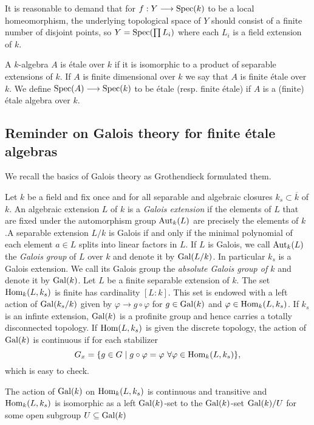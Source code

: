 It is reasonable to demand that for $f: Y \longrightarrow \operatorname{Spec}(k)$ to be a local homeomorphism, the underlying topological space of $Y$ should consist of a finite number of disjoint points, so $Y = \operatorname{Spec}(\prod L_i)$ where each $L_i$ is a field extension of $k$.

\begin{definition}
	A $k$-algebra $A$ is \'etale over $k$ if it is isomorphic to a product of separable extensions of $k$. If $A$ is finite dimensional over $k$ we say that $A$ is finite \'etale over $k$. We define $\operatorname{Spec}(A) \longrightarrow \operatorname{Spec}(k)$ to be \'etale (resp. finite \'etale) if $A$ is a (finite) \'etale algebra over $k$.
\end{definition}

\subsection{Reminder on Galois theory for finite \'etale algebras}
We recall the basics of Galois theory as Grothendieck formulated them.

\begin{construction}
	Let $k$ be a field and fix once and for all separable and algebraic closures $k_s \subset \overline{k}$ of $k$. An algebraic extension $L$ of $k$ is a \textit{Galois extension} if the elements of $L$ that are fixed under the automorphism group $\operatorname{Aut}_k(L)$ are precisely the elements of $k$.A separable extension $L/k$ is Galois if and only if the minimal polynomial of each element $a \in L$ splits into linear factors in $L$. If $L$ is Galois, we call $\operatorname{Aut}_k(L)$ the \textit{Galois group} of $L$ over $k$ and denote it by $\operatorname{Gal}(L/k)$. In particular $k_s$ is a Galois extension. We call its Galois group the \textit{absolute Galois group of $k$} and denote it by $\operatorname{Gal}(k)$. Let $L$ be a finite separable extension of $k$. The set $\operatorname{Hom}_k(L, k_s)$ is finite has cardinality $[L:k]$. This set is endowed with a left action of $\operatorname{Gal}(k_s/k)$ given by $\varphi \to g \circ \varphi$ for $g \in \operatorname{Gal}(k)$ and $\varphi \in \operatorname{Hom}_k(L, k_s)$. If $k_s$ is an infinte extension, $\operatorname{Gal}(k)$ is a profinite group and hence carries a totally disconnected topology. If $\operatorname{Hom}(L, k_s)$ is given the discrete topology, the action of $\operatorname{Gal}(k)$ is continuous if for each stabilizer
	\[G_x = \{ g \in G \mid g \circ \varphi = \varphi\ \forall\varphi \in \operatorname{Hom}_k(L, k_s)\}, \]
	which is easy to check.
\end{construction}

\begin{proposition}
	The action of $\operatorname{Gal}(k)$ on $\operatorname{Hom}_k(L, k_s)$ is continuous and transitive and $\operatorname{Hom}_k(L, k_s)$ is isomorphic as a left $\operatorname{Gal}(k)$-set to the $\operatorname{Gal}(k)$-set $\operatorname{Gal}(k)/U$ for some open subgroup $U \subseteq \operatorname{Gal}(k)$
\end{proposition}

